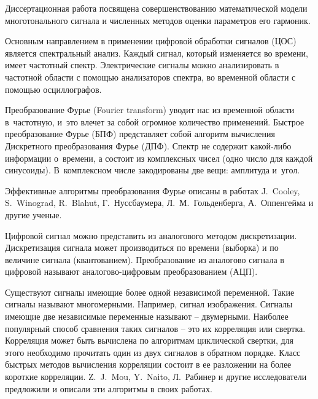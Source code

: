 {\actuality} 
Диссертационная работа посвящена совершенствованию математической модели многотонального сигнала и численных методов оценки параметров его гармоник. 

Основным направлением в применении цифровой обработки сигналов (ЦОС) является спектральный анализ. Каждый сигнал, который изменяется во времени, имеет частотный спектр. Электрические сигналы можно анализировать в частотной области с помощью анализаторов спектра, во временной области с помощью осциллографов. 

Преобразование Фурье (Fourier transform) уводит нас из временной области в частотную, и это влечет за собой огромное количество применений. Быстрое преобразование
Фурье (БПФ) представляет собой алгоритм вычисления Дискретного преобразования Фурье (ДПФ). Спектр не содержит какой-либо информации о времени, а состоит из комплексных чисел (одно число для каждой синусоиды). В комплексном числе закодированы две вещи: амплитуда и угол. 

Эффективные алгоритмы преобразования Фурье описаны в работах J.~Cooley, S.~Winograd, R.~Blahut, Г.~Нуссбаумера, Л.~М.~Гольденберга, А.~Оппенгейма и другие ученые. 


Цифровой сигнал можно представить из аналогового методом дискретизации. Дискретизация сигнала может производиться по времени (выборка) и по величине сигнала (квантованием). Преобразование из аналогово сигнала в цифровой называют аналогово-цифровым преобразованием (АЦП). 

Существуют сигналы имеющие более одной независимой переменной. Такие сигналы называют многомерными. Например, сигнал изображения. Сигналы имеющие две независимые переменные называют -- двумерными.
Наиболее популярный способ сравнения таких сигналов – это их корреляция или свертка. Корреляция может быть вычислена по алгоритмам циклической свертки, для этого необходимо прочитать один из двух сигналов в обратном порядке. Класс быстрых методов вычисления корреляции состоит в ее разложении на более короткие корреляции. Z.~J.~Mou, Y.~Naito, Л.~Рабинер и другие исследователи предложили и описали эти алгоритмы в своих работах.

